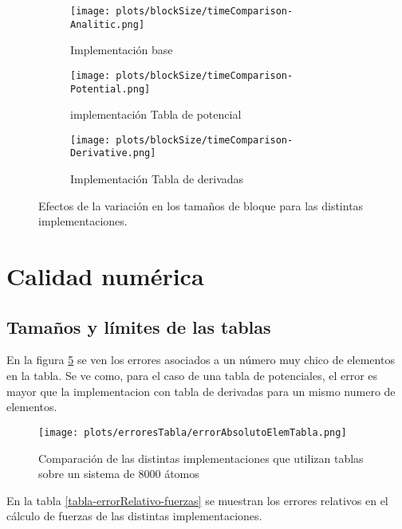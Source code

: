 \begin{figure}[htbp]
\centering
\begin{subfigure}[b]{\plotwidthtres}
   \texttt{[image: plots/blockSize/timeComparison-Analitic.png]}
   \caption{Implementación base}
   \label{fig:cpu-scalability-caroteno}
 \end{subfigure}
\begin{subfigure}[b]{\plotwidthtres}
   \texttt{[image: plots/blockSize/timeComparison-Potential.png]}
   \caption{implementación Tabla de potencial}
   \label{fig:cpu-scalability-fullereno}
 \end{subfigure}
\begin{subfigure}[b]{\plotwidthtres}
   \texttt{[image: plots/blockSize/timeComparison-Derivative.png]}
   \caption{Implementación Tabla de derivadas}
   \label{fig:cpu-scalability-hemo}
 \end{subfigure}
 \caption{Efectos de la variación en los tamaños de bloque para las distintas implementaciones.}
 \label{blockSize}
\end{figure}


\section{Calidad numérica}

\subsection{Tamaños y límites de las tablas}
En la figura \ref{errorAbsElemTabla} se ven los errores asociados a un número muy chico de elementos en la tabla. 
Se ve como, para el caso de una tabla de potenciales, el error es mayor que la implementacion con tabla de derivadas
para un mismo numero de elementos.

\begin{figure}[htbp]
\centering
   \texttt{[image: plots/erroresTabla/errorAbsolutoElemTabla.png]}
 \caption{Comparaci\'on de las distintas implementaciones que utilizan tablas sobre un sistema de 8000 átomos }
 \label{errorAbsElemTabla}
\end{figure}





En la tabla \ref{tabla-errorRelativo-fuerzas} se muestran los errores relativos en el cálculo de fuerzas de las distintas implementaciones.



